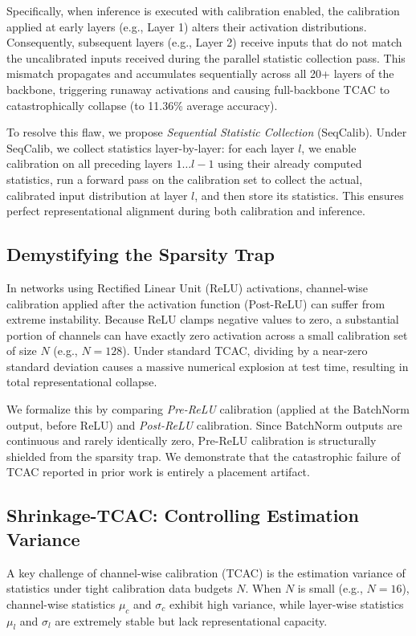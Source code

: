 \documentclass{article}
\theoremstyle{plain}
\theoremstyle{definition}
\theoremstyle{remark}
\begin{document}
Specifically, when inference is executed with calibration enabled, the calibration applied at early layers (e.g., Layer 1) alters their activation distributions. Consequently, subsequent layers (e.g., Layer 2) receive inputs that do not match the uncalibrated inputs received during the parallel statistic collection pass. This mismatch propagates and accumulates sequentially across all 20+ layers of the backbone, triggering runaway activations and causing full-backbone TCAC to catastrophically collapse (to 11.36\% average accuracy).

To resolve this flaw, we propose \textit{Sequential Statistic Collection} (SeqCalib). Under SeqCalib, we collect statistics layer-by-layer: for each layer $l$, we enable calibration on all preceding layers $1 \dots l-1$ using their already computed statistics, run a forward pass on the calibration set to collect the actual, calibrated input distribution at layer $l$, and then store its statistics. This ensures perfect representational alignment during both calibration and inference.

\subsection{Demystifying the Sparsity Trap}
In networks using Rectified Linear Unit (ReLU) activations, channel-wise calibration applied after the activation function (Post-ReLU) can suffer from extreme instability. Because ReLU clamps negative values to zero, a substantial portion of channels can have exactly zero activation across a small calibration set of size $N$ (e.g., $N=128$). Under standard TCAC, dividing by a near-zero standard deviation causes a massive numerical explosion at test time, resulting in total representational collapse.

We formalize this by comparing \textit{Pre-ReLU} calibration (applied at the BatchNorm output, before ReLU) and \textit{Post-ReLU} calibration. Since BatchNorm outputs are continuous and rarely identically zero, Pre-ReLU calibration is structurally shielded from the sparsity trap. We demonstrate that the catastrophic failure of TCAC reported in prior work is entirely a placement artifact.

\subsection{Shrinkage-TCAC: Controlling Estimation Variance}
A key challenge of channel-wise calibration (TCAC) is the estimation variance of statistics under tight calibration data budgets $N$. When $N$ is small (e.g., $N=16$), channel-wise statistics $\mu_{c}$ and $\sigma_{c}$ exhibit high variance, while layer-wise statistics $\mu_{l}$ and $\sigma_{l}$ are extremely stable but lack representational capacity. 
\end{document}
